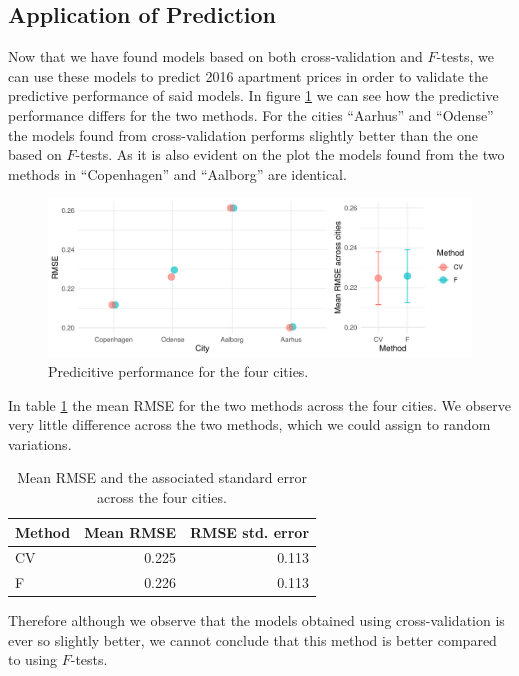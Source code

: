 \subsection{Application of Prediction}\label{subsec:app_of_prediction}
Now that we have found models based on both cross-validation and $F$-tests, we can use these models to predict 2016 apartment prices in order to validate the predictive performance of said models.
In figure \ref{fig:predictive_performance} we can see how the predictive performance differs for the two methods.
For the cities ``Aarhus'' and ``Odense'' the models found from cross-validation performs slightly better than the one based on $F$-tests.
As it is also evident on the plot the models found from the two methods in ``Copenhagen'' and ``Aalborg'' are identical.
\begin{figure}[H]
    \centering
    \includegraphics[width = .9\textwidth]{figures/Data_introduction/predictive_performance.pdf}
    \caption{Predicitive performance for the four cities.}
    \label{fig:predictive_performance}
\end{figure}
In table \ref{tbl:predictive_performance} the mean RMSE for the two methods across the four cities.
We observe very little difference across the two methods, which we could assign to random variations.
\begin{table}[H]
    \centering
    \begin{tabular}{lrr}
        \toprule
        \textbf{Method} & \textbf{Mean RMSE} & \textbf{RMSE std.$\!$ error}\\
        \midrule
        CV & 0.225 & 0.113\\
        F & 0.226 & 0.113\\
        \bottomrule
    \end{tabular}
    \caption{Mean RMSE and the associated standard error across the four cities.}
    \label{tbl:predictive_performance}
\end{table}
Therefore although we observe that the models obtained using cross-validation is ever so slightly better, we cannot conclude that this method is better compared to using $F$-tests.

